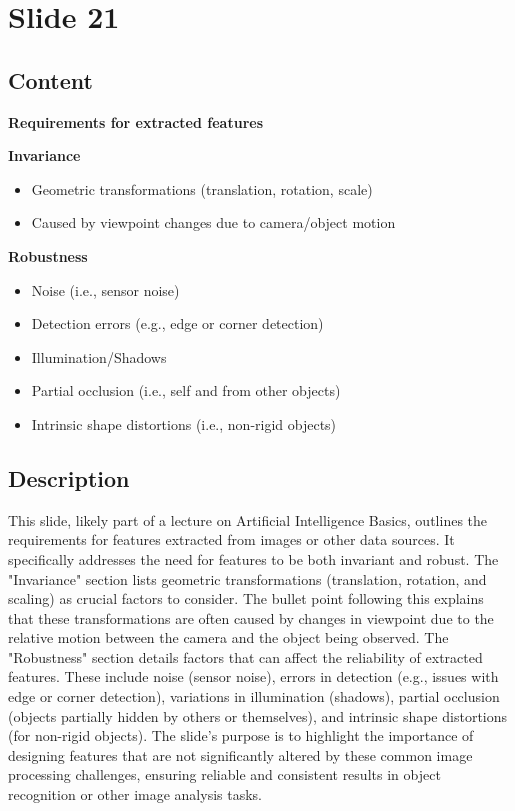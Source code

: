 \documentclass{article}%
\begin{document}
%
\newpage%
\section{Slide 21}%
\label{sec:Slide21}%
\subsection{Content}%

\textbf{Requirements for extracted features}

\textbf{Invariance}
\begin{itemize}
    \item Geometric transformations (translation, rotation, scale)
    \item Caused by viewpoint changes due to camera/object motion
\end{itemize}

\textbf{Robustness}
\begin{itemize}
    \item Noise (i.e., sensor noise)
    \item Detection errors (e.g., edge or corner detection)
    \item Illumination/Shadows
    \item Partial occlusion (i.e., self and from other objects)
    \item Intrinsic shape distortions (i.e., non-rigid objects)
\end{itemize}
%
\subsection{Description}%
This slide, likely part of a lecture on Artificial Intelligence Basics, outlines the requirements for features extracted from images or other data sources.  It specifically addresses the need for features to be both invariant and robust.  The "Invariance" section lists geometric transformations (translation, rotation, and scaling) as crucial factors to consider.  The bullet point following this explains that these transformations are often caused by changes in viewpoint due to the relative motion between the camera and the object being observed.  The "Robustness" section details factors that can affect the reliability of extracted features.  These include noise (sensor noise), errors in detection (e.g., issues with edge or corner detection), variations in illumination (shadows), partial occlusion (objects partially hidden by others or themselves), and intrinsic shape distortions (for non-rigid objects).  The slide's purpose is to highlight the importance of designing features that are not significantly altered by these common image processing challenges, ensuring reliable and consistent results in object recognition or other image analysis tasks.%
\end{document}
